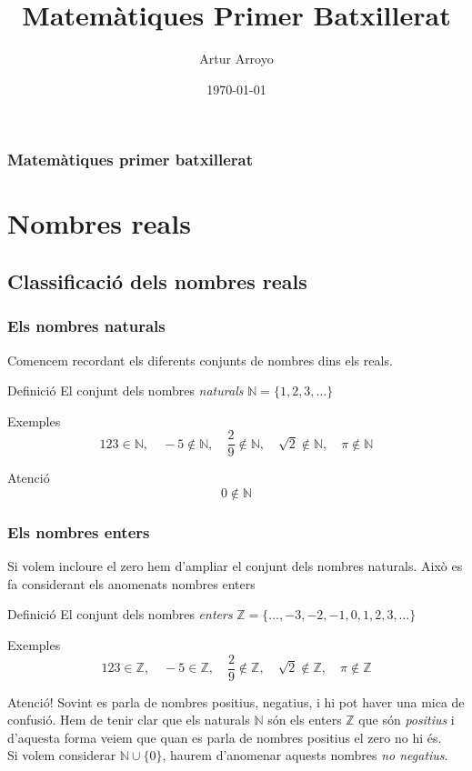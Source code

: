\documentclass{beamer}
\begin{document}
\title{Matemàtiques Primer Batxillerat}
\author{Artur Arroyo}
\date{\today}


\begin{frame}
\titlepage
\end{frame}

\begin{frame}\frametitle{Matemàtiques primer batxillerat}\tableofcontents[pausesubsections]
\end{frame}


\section{Nombres reals}


\subsection{Classificació dels nombres reals}
\begin{frame}\frametitle{Els nombres naturals}
Comencem recordant els diferents conjunts de nombres dins els
reals.\pause
\begin{block}{Definició}
El conjunt dels nombres \emph{naturals}
$\mathbb{N}=\{1,2,3,\ldots\}$
\end{block}
\pause
\begin{exampleblock}{Exemples}
$$123\in \mathbb{N},\quad -5\notin\mathbb{N}, \quad
\frac{2}{9}\notin\mathbb{N}, \quad \sqrt{2}\notin\mathbb{N}, \quad
\pi\notin\mathbb{N}$$
\end{exampleblock}\pause
\begin{alertblock}{Atenció}
$$0\notin\mathbb{N}$$
\end{alertblock}
\end{frame}
\begin{frame}\frametitle{Els nombres enters}
Si volem incloure el zero hem d'ampliar el conjunt dels nombres
naturals. Això es fa considerant els anomenats nombres
enters\pause
\begin{block}{Definició}
El conjunt dels nombres \emph{enters} $\mathbb{Z}=\{\ldots,
-3,-2,-1,0, 1,2,3,\ldots\}$
\end{block}\pause
\begin{exampleblock}{Exemples}
$$123\in \mathbb{Z},\quad -5\in\mathbb{Z}, \quad
\frac{2}{9}\notin\mathbb{Z}, \quad \sqrt{2}\notin\mathbb{Z}, \quad
\pi\notin\mathbb{Z}$$
\end{exampleblock}
\end{frame}
\begin{frame}
\begin{alertblock}{Atenció!}
Sovint es parla de nombres positius, negatius, i hi pot haver una
mica de confusió. Hem de tenir clar que els naturals $\mathbb{N}$
són els enters $\mathbb{Z}$ que són \emph{positius} i d'aquesta
forma veiem que quan es parla de nombres positius el zero no hi
és. \\
Si volem considerar $\mathbb{N}\cup \{0\}$, haurem
d'anomenar aquests nombres \emph{no negatius}.
\end{alertblock}
\end{frame}
\end{document}
